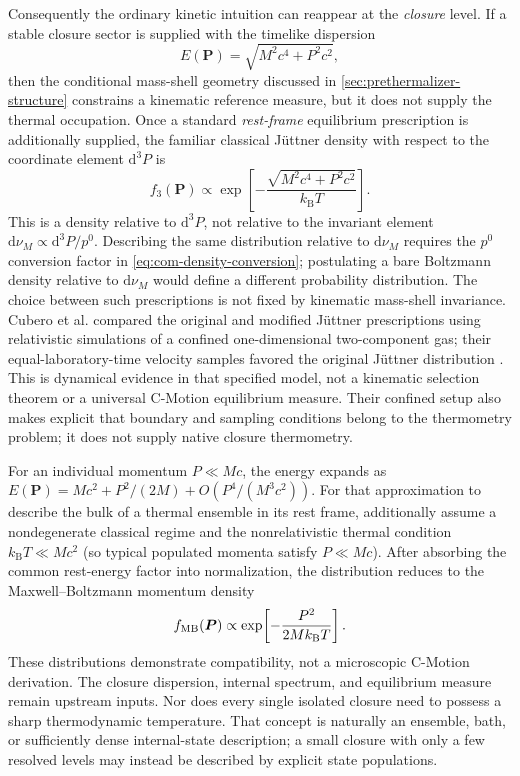 \documentclass[11pt]{article}
\theoremstyle{definition}
\newcommand{\cmotion}{\mbox{C-Motion}}
\newcommand{\dd}{\mathrm{d}}
\newcommand{\kb}{k_{\mathrm B}}
\begin{document}
Consequently the ordinary kinetic intuition can reappear at the \emph{closure} level.
If a stable closure sector is supplied with the timelike dispersion
\begin{equation}
  E(\bm P)=\sqrt{M^2c^4+P^2c^2},
  \label{eq:timelike-control}
\end{equation}
then the conditional mass-shell geometry discussed in \cref{sec:prethermalizer-structure}
constrains a kinematic reference measure, but it does not supply the thermal occupation.
Once a standard \emph{rest-frame} equilibrium prescription is additionally supplied,
the familiar classical J\"uttner density \cite{Juttner1911} with respect to the coordinate element
$\dd^3P$ is
\begin{equation}
  f_3(\bm P)\propto
  \exp\!\left[-\frac{\sqrt{M^2c^4+P^2c^2}}{\kb T}\right].
  \label{eq:juttner-control}
\end{equation}
This is a density relative to $\dd^3P$, not relative to the invariant element
$\dd\nu_M\propto\dd^3P/p^0$.  Describing the same distribution relative to
$\dd\nu_M$ requires the $p^0$ conversion factor in
\cref{eq:com-density-conversion}; postulating a bare Boltzmann density relative to
$\dd\nu_M$ would define a different probability distribution.  The choice between
such prescriptions is not fixed by kinematic mass-shell invariance.
Cubero et al. compared the original and modified J\"uttner prescriptions
using relativistic simulations of a confined one-dimensional two-component
gas; their equal-laboratory-time velocity samples favored the original
J\"uttner distribution \cite{Cubero2007RelativisticThermometers}.
This is dynamical evidence in that specified model, not a kinematic selection
theorem or a universal C-Motion equilibrium measure. Their confined setup
also makes explicit that boundary and sampling conditions belong to the
thermometry problem; it does not supply native closure thermometry.

For an individual momentum $P\ll Mc$, the energy expands as
$E(\bm P)=Mc^2+P^2/(2M)+O(P^4/(M^3c^2))$.  For that approximation to describe
the bulk of a thermal ensemble in its rest frame, additionally assume a
nondegenerate classical regime and the nonrelativistic thermal condition
$\kb T\ll Mc^2$ (so typical populated momenta satisfy $P\ll Mc$).  After
absorbing the common rest-energy factor into normalization, the distribution
reduces to the Maxwell--Boltzmann momentum density
\begin{equation}
  f_{\rm MB}(\bm P)\propto
  \exp\!\left[-\frac{P^2}{2M\kb T}\right].
  \label{eq:maxwell-control}
\end{equation}
These distributions demonstrate compatibility, not a microscopic \cmotion{} derivation.  The
closure dispersion, internal spectrum, and equilibrium measure remain upstream inputs.  Nor
does every single isolated closure need to possess a sharp thermodynamic temperature.  That
concept is naturally an ensemble, bath, or sufficiently dense internal-state description;
a small closure with only a few resolved levels may instead be described by explicit state
populations.
\end{document}
